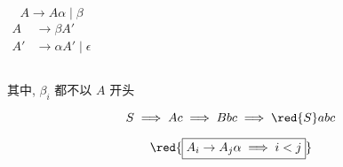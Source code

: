 \begin{frame}{}
  \begin{center}

  \end{center}
\end{frame}

\begin{frame}{}
  \begin{center}
  \end{center}

  \begin{columns}
      \[
        A \to A \alpha \mid \beta
      \]
      \begin{align*}
        A &\to \beta A' \\[5pt]
        A' &\to \alpha A' \mid \epsilon
      \end{align*}
  \end{columns}
\end{frame}

\begin{frame}{}
  \begin{center}
    
    其中, $\beta_{i}$ 都不以 $A$ 开头

    \vspace{0.30cm}
    
  \end{center}
\end{frame}

\begin{frame}{}
  \begin{center}

    \vspace{-0.30cm}
    

    \vspace{-0.30cm}
    \[
      S \implies Ac \implies Bbc \implies \red{S}abc
    \]

    \pause
	\vspace{-0.30cm}
    \[
      \red{\boxed{A_{i} \to A_{j} \alpha \implies i < j}}
    \]

    \pause
  \end{center}
\end{frame}

